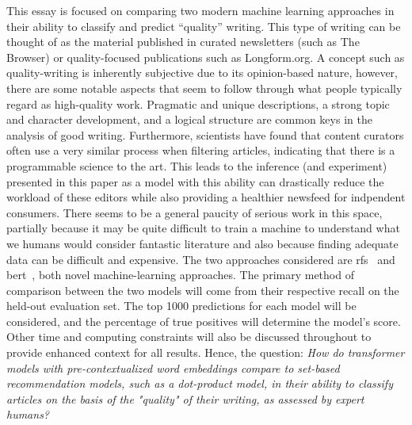 This essay is focused on comparing two modern machine learning approaches in their ability to classify and predict “quality” writing. This type of writing can be thought of as the material published in curated newsletters (such as The Browser) or quality-focused publications such as Longform.org. A concept such as quality-writing is inherently subjective due to its opinion-based nature, however, there are some notable aspects that seem to follow through what people typically regard as high-quality work. Pragmatic and unique descriptions, a strong topic and character development, and a logical structure are common keys in the analysis of good writing. Furthermore, scientists have found that content curators often use a very similar process when filtering articles, indicating that there is a programmable science to the art. This leads to the inference (and experiment) presented in this paper as a model with this ability can drastically reduce the workload of these editors while also providing a healthier newsfeed for indpendent consumers. There seems to be a general paucity of serious work in this space, partially because it may be quite difficult to train a machine to understand what we humans would consider fantastic literature and also because finding adequate data can be difficult and expensive. The two approaches considered are \gls{rfs}~\parencite{altosaar2020rankfromsets:} and \acrshort{bert}~\parencite{devlin2019bert:}, both novel machine-learning approaches. The primary method of comparison between the two models will come from their respective recall on the held-out evaluation set. The top 1000 predictions for each model will be considered, and the percentage of true positives will determine the model’s score. Other time and computing constraints will also be discussed throughout to provide enhanced context for all results. Hence, the question: \emph{How do transformer models with pre-contextualized word embeddings compare to set-based recommendation models, such as a dot-product model, in their ability to classify articles on the basis of the "quality" of their writing, as assessed by expert humans?}